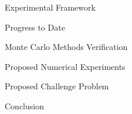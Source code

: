 \documentclass{beamer}
\begin{document}
\begin{frame}{Experimental Framework}

\end{frame}

\begin{frame}{Progress to Date}

\end{frame}

\begin{frame}{Monte Carlo Methods Verification}

\end{frame}

\begin{frame}{Proposed Numerical Experiments}

\end{frame}

\begin{frame}{Proposed Challenge Problem}

\end{frame}

\begin{frame}{Conclusion}

\end{frame}

\end{document}
